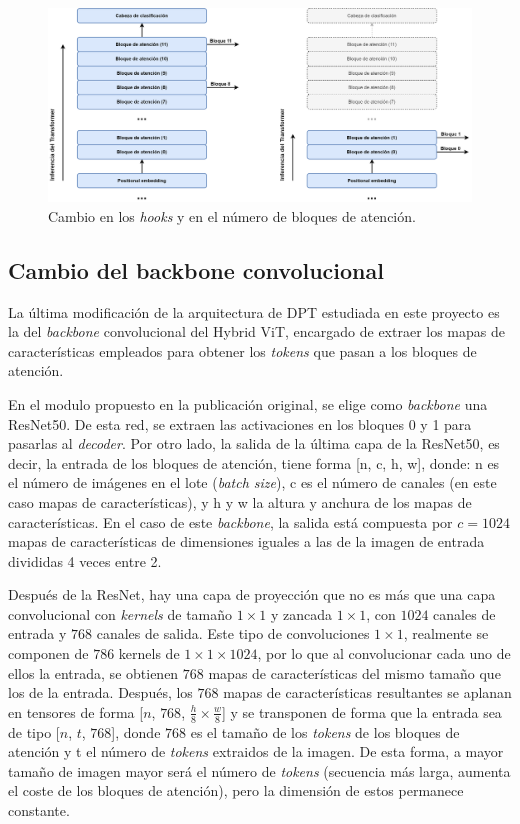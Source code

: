 \begin{figure}[H]
\centering
\includegraphics[width=\textwidth]{imagenes/DPT-cambio-bloques-transformer.png}
\caption{Cambio en los \textit{hooks} y en el número de bloques de atención.}
\label{fig:attention_block_num}
\end{figure}

\subsection{Cambio del backbone convolucional}
La última modificación de la arquitectura de DPT estudiada en este proyecto es la del \textit{backbone} convolucional del Hybrid ViT, encargado de extraer los mapas de características empleados para obtener los \textit{tokens} que pasan a los bloques de atención. 

En el modulo propuesto en la publicación original, se elige como \textit{backbone} una ResNet50. De esta red, se extraen las activaciones en los bloques 0 y 1 para pasarlas al \textit{decoder}. Por otro lado, la salida de la última capa de la ResNet50, es decir, la entrada de los bloques de atención, tiene forma [n, c, h, w], donde: n es el número de imágenes en el lote (\textit{batch size}), c es el número de canales (en este caso mapas de características), y h y w la altura y anchura de los mapas de características. En el caso de este \textit{backbone}, la salida está compuesta por $c=1024$ mapas de características de dimensiones iguales a las de la imagen de entrada divididas 4 veces entre 2.

Después de la ResNet, hay una capa de proyección que no es más que una capa convolucional con \textit{kernels} de tamaño $1\times1$ y zancada $1\times1$, con $1024$ canales de entrada y $768$ canales de salida. Este tipo de convoluciones $1\times1$, realmente se componen de $786$ kernels de $1\times1\times1024$, por lo que al convolucionar cada uno de ellos la entrada, se obtienen $768$ mapas de características del mismo tamaño que los de la entrada. Después, los $768$ mapas de características resultantes se aplanan en tensores de forma [$n$, $768$, $\frac{h}{8} \times \frac{w}{8}$] y se transponen de forma que la entrada sea de tipo [$n$, $t$, $768$], donde $768$ es el tamaño de los \textit{tokens} de los bloques de atención y t el número de \textit{tokens} extraidos de la imagen. De esta forma, a mayor tamaño de imagen mayor será el número de \textit{tokens} (secuencia más larga, aumenta el coste de los bloques de atención), pero la dimensión de estos permanece constante.

